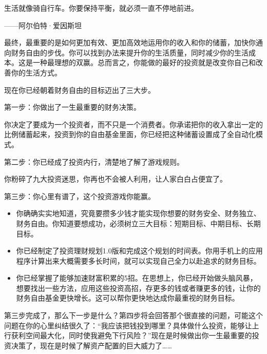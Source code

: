 \begin{BookQuote}
生活就像骑自行车。你要保持平衡，就必须一直不停地前进。

\hfill ——阿尔伯特·爱因斯坦
\end{BookQuote}

最终，最重要的是如何更加有效、更加高效地运用你的收入和你的储蓄，加快你通向财务自由的步伐。你可以找到办法来提升你的生活质量，同时减少你的生活成本。这是一种最理想的双赢。总而言之，你能做的最好的投资就是改变你自己和改善你的生活方式。

现在你已经朝着财务自由的目标迈出了三大步。

第一步：你做出了一生最重要的财务决策。

你决定了要成为一个投资者，而不只是一个消费者。你承诺把你的收入拿出一定的比例储蓄起来，投资到你的自由基金里面，你已经把这种储蓄设置成了全自动化模式。

第二步：你已经成了投资内行，清楚地了解了游戏规则。

你粉碎了九大投资迷思，你再也不会被人利用，让人家白白占便宜了。

第三步：你心里有谱了，这个投资游戏你能赢。

\begin{itemize}
\item 你确确实实地知道，究竟要攒多少钱才能实现你想要的财务安全、财务独立、财务自由。你知道要想成功，必须树立三大目标：短期目标、中期目标、长期目标。
\item 你已经制定了投资理财规划1.0版和完成这个规划的时间表。你用手机上的应用程序计算出来大概需要多长时间，就可以实现自己全力以赴追求的财务目标。
\item 你已经掌握了能够加速财富积累的5招。在思想上，你已经开始做头脑风暴，想要找出一些方法，应用这些投资高招，存更多的钱或者赚更多的钱，让你的财务自由基金更快增长。这可以帮你更快地达成你最重视的财务目标。
\end{itemize}

第三步完成了，那么下一步是什么？第四步将会回答那个很直接的问题，可能这个问题在你的心里纠结很久了：“我应该把钱投到哪里？具体做什么投资，能够让上行获利空间最大化，同时使我避免下行风险？”现在是时候做出你一生最重要的投资决策了，现在是时候了解资产配置的巨大威力了……
